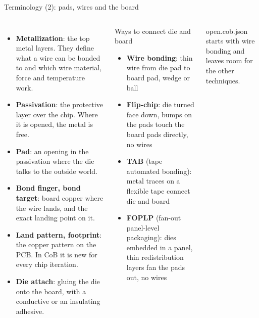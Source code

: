 \documentclass[aspectratio=169,11pt]{beamer}
\begin{document}
\begin{frame}{Terminology (2): pads, wires and the board}
  \footnotesize
  \begin{columns}[T]
      \begin{itemize}\setlength\itemsep{0.35em}
        \item \textbf{Metallization}: the top metal layers. They define what a wire can be bonded to and which wire material, force and temperature work.
        \item \textbf{Passivation}: the protective layer over the chip. Where it is opened, the metal is free.
        \item \textbf{Pad}: an opening in the passivation where the die talks to the outside world.
        \item \textbf{Bond finger, bond target}: board copper where the wire lands, and the exact landing point on it.
        \item \textbf{Land pattern, footprint}: the copper pattern on the PCB. In CoB it is new for every chip iteration.
        \item \textbf{Die attach}: gluing the die onto the board, with a conductive or an insulating adhesive.
      \end{itemize}
      \begin{block}{Ways to connect die and board}
        \begin{itemize}\setlength\itemsep{0.15em}
          \item \textbf{Wire bonding}: thin wire from die pad to board pad, wedge or ball
          \item \textbf{Flip-chip}: die turned face down, bumps on the pads touch the board pads directly, no wires
          \item \textbf{TAB} (tape automated bonding): metal traces on a flexible tape connect die and board
          \item \textbf{FOPLP} (fan-out panel-level packaging): dies embedded in a panel, thin redistribution layers fan the pads out, no wires
        \end{itemize}
      \end{block}
      {\scriptsize\color{cobgrey} open.cob.json starts with wire bonding and leaves room for the other techniques.}
  \end{columns}
\end{frame}
\end{document}
